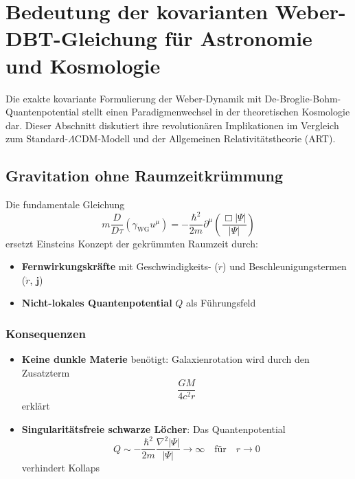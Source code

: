 \newpage
\section{Bedeutung der kovarianten Weber-DBT-Gleichung für Astronomie und Kosmologie}
\label{sec:cosmological_implications}

Die exakte kovariante Formulierung der Weber-Dynamik mit De-Broglie-Bohm-Quantenpotential stellt einen Paradigmenwechsel in der theoretischen Kosmologie dar. Dieser Abschnitt diskutiert ihre revolutionären Implikationen im Vergleich zum Standard-$\Lambda$CDM-Modell und der Allgemeinen Relativitätstheorie (ART).

\subsection{Gravitation ohne Raumzeitkrümmung}
Die fundamentale Gleichung
\begin{equation}
m \frac{D}{D\tau}(\gamma_{\mathrm{WG}} u^\mu) = -\frac{\hbar^2}{2m}\partial^\mu\left(\frac{\Box|\Psi|}{|\Psi|}\right)
\end{equation}
ersetzt Einsteins Konzept der gekrümmten Raumzeit durch:

\begin{itemize}
\item \textbf{Fernwirkungskräfte} mit Geschwindigkeits- ($\dot{r}$) und Beschleunigungstermen ($\ddot{r}$, $\mathbf{j}$)
\item \textbf{Nicht-lokales Quantenpotential} $Q$ als Führungsfeld
\end{itemize}

\subsubsection{Konsequenzen}
\begin{itemize}
\item \textbf{Keine dunkle Materie} benötigt: Galaxienrotation wird durch den Zusatzterm
\begin{equation}
\frac{GM}{4c^2r}
\end{equation}
erklärt

\item \textbf{Singularitätsfreie schwarze Löcher}: Das Quantenpotential
\begin{equation}
Q \sim -\frac{\hbar^2}{2m}\frac{\nabla^2|\Psi|}{|\Psi|} \to \infty \quad \text{für} \quad r \to 0
\end{equation}
verhindert Kollaps
\end{itemize}

